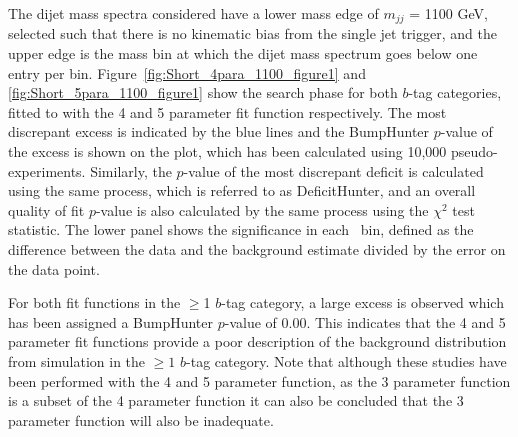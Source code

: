 The dijet mass spectra considered have a lower mass edge of $m_{jj}$ = 1100 GeV,
selected such that there is no kinematic bias from the single jet trigger,
and the upper edge is the mass bin at which the dijet mass spectrum goes below one entry per bin.
Figure~\ref{fig:Short_4para_1100_figure1} and \ref{fig:Short_5para_1100_figure1} show the search phase
for both $b$-tag categories, fitted to with the 4 and 5 parameter fit function respectively.
The most discrepant excess is indicated by the blue lines and the BumpHunter \mbox{$p$-value} of the excess is shown on the plot,
which has been calculated using 10,000 pseudo-experiments.
Similarly, the \mbox{$p$-value} of the most discrepant deficit is calculated using the same process, which is referred to as DeficitHunter,
and an overall quality of fit \mbox{$p$-value} is also calculated by the same process using the $\chi^{2}$ test statistic.
The lower panel shows the significance in each~\mjj{} bin,
defined as the difference between the data and the background estimate divided by the error on the data point.

For both fit functions in the $\geq$1 $b$-tag category,
a large excess is observed which has been assigned a BumpHunter \mbox{$p$-value} of 0.00.
This indicates that the 4 and 5 parameter fit functions
provide a poor description of the background distribution from simulation
in the $\geq1$ $b$-tag category.
Note that although these studies have been performed with the 4 and 5 parameter function,
as the 3 parameter function is a subset of the 4 parameter function it can also be concluded
that the 3 parameter function will also be inadequate.

